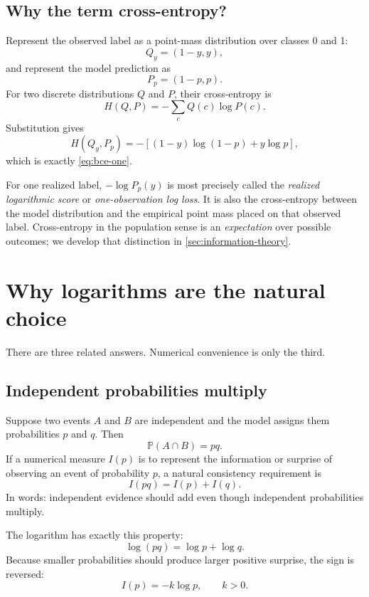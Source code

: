 \documentclass[11pt]{article}
\newcommand{\Prob}{\mathbb{P}}
\theoremstyle{definition}
\begin{document}
\subsection{Why the term cross-entropy?}

Represent the observed label as a point-mass distribution over classes 0 and 1:
\[
Q_y=(1-y,y),
\]
and represent the model prediction as
\[
P_p=(1-p,p).
\]
For two discrete distributions $Q$ and $P$, their cross-entropy is
\begin{equation}
H(Q,P)=-\sum_c Q(c)\log P(c).
\label{eq:cross-entropy-general}
\end{equation}
Substitution gives
\[
H(Q_y,P_p)
=-\left[(1-y)\log(1-p)+y\log p\right],
\]
which is exactly \cref{eq:bce-one}.

\begin{keyidea}
For one realized label, $-\log P_p(y)$ is most precisely called the \emph{realized logarithmic score} or \emph{one-observation log loss}. It is also the cross-entropy between the model distribution and the empirical point mass placed on that observed label. Cross-entropy in the population sense is an \emph{expectation} over possible outcomes; we develop that distinction in \cref{sec:information-theory}.
\end{keyidea}

\section{Why logarithms are the natural choice}
\label{sec:why-log}

There are three related answers. Numerical convenience is only the third.

\subsection{Independent probabilities multiply}

Suppose two events $A$ and $B$ are independent and the model assigns them probabilities $p$ and $q$. Then
\[
\Prob(A\cap B)=pq.
\]
If a numerical measure $I(p)$ is to represent the information or surprise of observing an event of probability $p$, a natural consistency requirement is
\begin{equation}
I(pq)=I(p)+I(q).
\label{eq:additivity}
\end{equation}
In words: independent evidence should add even though independent probabilities multiply.

The logarithm has exactly this property:
\[
\log(pq)=\log p+\log q.
\]
Because smaller probabilities should produce larger positive surprise, the sign is reversed:
\begin{equation}
\boxed{I(p)=-k\log p},\qquad k>0.
\label{eq:self-information}
\end{equation}
\end{document}
